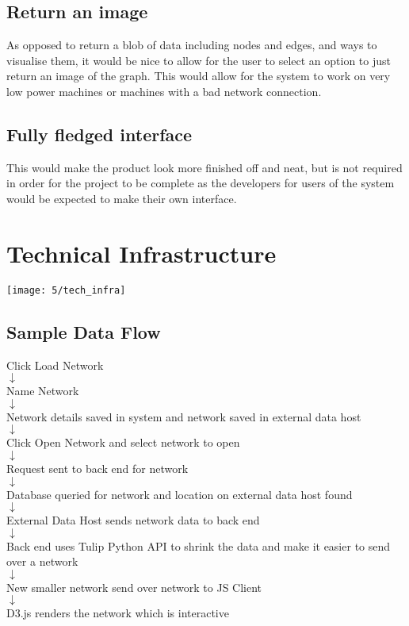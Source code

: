 \documentclass[../dissertation.tex]{subfiles}
\begin{document}
\subsection{Return an image}
As opposed to return a blob of data including nodes and edges, and ways to visualise them, it would be nice to allow for the user to select an option to just return an image of the graph. This would allow for the system to work on very low power machines or machines with a bad network connection.

\subsection{Fully fledged interface}
This would make the product look more finished off and neat, but is not required in order for the project to be complete as the developers for users of the system would be expected to make their own interface.

\section{Technical Infrastructure}

\texttt{[image: 5/tech\_infra]}

\subsection{Sample Data Flow}

{\centering
Click Load Network
\\$\downarrow$\\
Name Network
\\$\downarrow$\\
Network details saved in system and network saved in external data host
\\$\downarrow$\\ 
Click Open Network and select network to open
\\$\downarrow$\\
Request sent to back end for network
\\$\downarrow$\\
Database queried for network and location on external data host found
\\$\downarrow$\\
External Data Host sends network data to back end
\\$\downarrow$\\ 
Back end uses Tulip Python API to shrink the data and make it easier to send over a network
\\$\downarrow$\\
New smaller network send over network to JS Client
\\$\downarrow$\\
D3.js renders the network which is interactive\\
}
\end{document}

